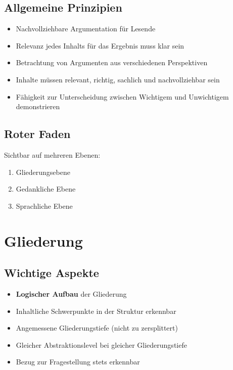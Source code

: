 \documentclass[12pt,a4paper,oneside]{article}
\begin{document}
\subsection{Allgemeine Prinzipien}
\begin{itemize}
    \item Nachvollziehbare Argumentation für Lesende
    \item Relevanz jedes Inhalts für das Ergebnis muss klar sein
    \item Betrachtung von Argumenten aus verschiedenen Perspektiven
    \item Inhalte müssen relevant, richtig, sachlich und nachvollziehbar sein
    \item Fähigkeit zur Unterscheidung zwischen Wichtigem und Unwichtigem demonstrieren
\end{itemize}

\subsection{Roter Faden}
Sichtbar auf mehreren Ebenen:
\begin{enumerate}
    \item Gliederungsebene
    \item Gedankliche Ebene
    \item Sprachliche Ebene
\end{enumerate}

\section{Gliederung}

\subsection{Wichtige Aspekte}
\begin{itemize}
    \item \textbf{Logischer Aufbau} der Gliederung
    \item Inhaltliche Schwerpunkte in der Struktur erkennbar
    \item Angemessene Gliederungstiefe (nicht zu zersplittert)
    \item Gleicher Abstraktionslevel bei gleicher Gliederungstiefe
    \item Bezug zur Fragestellung stets erkennbar
\end{itemize}
\end{document}
